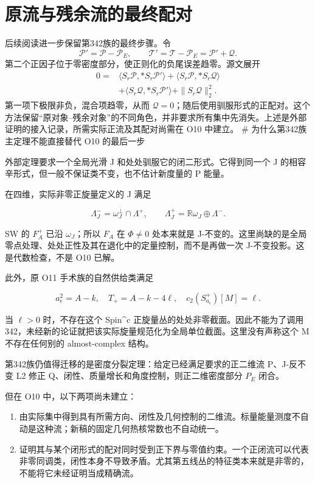 \documentclass[UTF8,11pt,openany,oneside,fontset=none]{ctexbook}
\providecommand{\tightlist}{\setlength{\itemsep}{1pt}\setlength{\parskip}{0pt}}
\begin{document}
\section{原流与残余流的最终配对}\label{ch6:ux539fux6d41ux4e0eux6b8bux4f59ux6d41ux7684ux6700ux7ec8ux914dux5bf9}

后续阅读进一步保留第342族的最终步骤。令 \[
\mathscr P'=\mathscr P-\mathscr P_E,\qquad
\mathscr T'=\mathscr T-\mathscr P_E=\mathscr P'+\mathscr Q.
\] 第二个正因子位于零密度部分，使正则化的负尾误差趋零。源文展开 \[
\begin{aligned}
0={}&\langle S_r\mathscr P,*S_r\mathscr P'\rangle
+\langle S_r\mathscr P,*S_r\mathscr Q\rangle\\
&+\langle S_r\mathscr Q,*S_r\mathscr P'\rangle
+\|S_r\mathscr Q\|_2^2.
\end{aligned}
\] 第一项下极限非负，混合项趋零，从而 \(\mathscr Q=0\)；随后使用驯服形式的正配对。这个方法保留``原对象--残余对象''的不同角色，并非要求所有集中先消失。上述是外部证明的接入记录，所需实际正流及其配对尚需在 O10 中建立。\cite{OAI342} \# 为什么第342族主定理不能直接替代 O10 的最后一步

外部定理要求一个全局光滑 J 和处处驯服它的闭二形式。它得到同一个 J 的相容辛形式，但一般不保证类不变，也不估计新度量的 P 能量。

在四维，实际非零正旋量定义的 J 满足

\[
 \Lambda_J^-=\omega_J^\perp\cap\Lambda^+,
 \qquad \Lambda_J^+=\mathbb R\omega_J\oplus\Lambda^-.
\]

SW 的 \(F_A^+\) 已沿 \(\omega_J\)；所以 \(F_A\) 在 \(\Phi\ne0\) 处本来就是 J-不变的。这里尚缺的是全局零点处理、处处正性及其在退化中的定量控制，而不是再做一次 J-不变投影。这是代数检查，不是 O10 已解。

此外，原 O11 手术族的自然供给类满足

\[
 a_\epsilon^2=A-k,
 \quad T_+=A-k-4\ell,
 \quad c_2(S^+_{a_\epsilon})[M]=\ell.
\]

当 \(\ell>0\) 时，不存在这个 Spin\^{}c 正旋量丛的处处非零截面。因此不能为了调用342，未经新的论证就把该实际旋量规范化为全局单位截面。这里没有声称这个 M 不存在任何别的 almost-complex 结构。

第342族仍值得迁移的是密度分裂定理：给定已经满足要求的正二维流 P、J-反不变 L2 修正 Q、闭性、质量增长和角度控制，则正二维密度部分 \(P_E\) 闭合。

但在 O10 中，以下两项尚未建立：

\begin{enumerate}
\def\labelenumi{\arabic{enumi}.}
\tightlist
\item
  由实际集中得到具有所需方向、闭性及几何控制的二维流。标量能量测度不自动是这种流；新稿的固定几何热核常数也不自动统一。
\item
  证明其与某个闭形式的配对同时受到正下界与零值约束。一个正闭流可以代表非零同调类，闭性本身不导致矛盾。尤其第五线丛的特征类本来就是非零的，不能将它未经证明当成精确流。
\end{enumerate}
\end{document}
